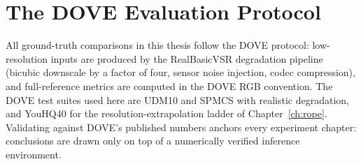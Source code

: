 \section{The DOVE Evaluation Protocol}
\label{sec:found:dove}

All ground-truth comparisons in this thesis follow the DOVE \cite{yang_dove_2024}
protocol: low-resolution inputs are produced by the RealBasicVSR
\cite{chan_realbasicvsr_2022} degradation pipeline (bicubic downscale by a factor of
four, sensor noise injection, codec compression), and full-reference metrics are computed
in the DOVE RGB convention. The DOVE test suites used here are UDM10 \cite{yi_pfnl_2019}
and SPMCS \cite{tao_spmcs_2017} with realistic degradation, and YouHQ40
\cite{zhou_upscale_2024} for the resolution-extrapolation ladder of
Chapter~\ref{ch:rope}. Validating against DOVE's published numbers anchors every
experiment chapter: conclusions are drawn only on top of a numerically verified
inference environment.
